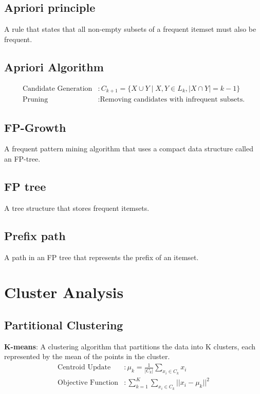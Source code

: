 \documentclass{article}
\begin{document}
\subsection{Apriori principle}
A rule that states that all non-empty subsets of a frequent itemset must also be frequent.

\subsection{Apriori Algorithm}
\begin{align*}
    \text{Candidate Generation} &: C_{k+1} = \{ X \cup Y \mid X, Y \in L_k, |X \cap Y| = k - 1 \} \\
    \text{Pruning} &: \text{Removing candidates with infrequent subsets.}
\end{align*}

\subsection{FP-Growth}
A frequent pattern mining algorithm that uses a compact data structure called an FP-tree.

\subsection{FP tree}
A tree structure that stores frequent itemsets.

\subsection{Prefix path}
A path in an FP tree that represents the prefix of an itemset.

\section{Cluster Analysis}

\subsection{Partitional Clustering}
\textbf{K-means}: A clustering algorithm that partitions the data into K clusters, each represented by the mean of the points in the cluster.
\begin{align*}
    \text{Centroid Update} &: \mu_k = \frac{1}{|C_k|} \sum_{x_i \in C_k} x_i \\
    \text{Objective Function} &: \sum_{k=1}^{K} \sum_{x_i \in C_k} || x_i - \mu_k ||^2
\end{align*}
\end{document}
